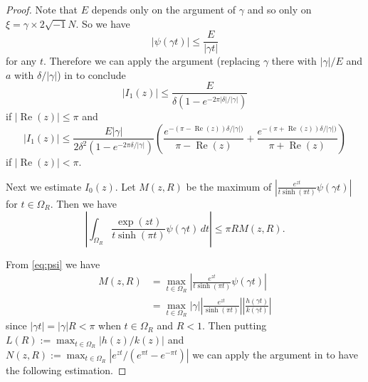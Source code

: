 \documentclass[a4paper]{amsart}
\theoremstyle{plain}
\theoremstyle{definition}
\theoremstyle{remark}
\renewcommand{\Re}{\operatorname{Re}}
\numberwithin{equation}{section}
\begin{document}
\begin{proof}
Note that $E$ depends only on the argument of $\gamma$ and so only on $\xi=\gamma\times 2\sqrt{-1}N$.
So we have
\begin{equation*}
  |\psi(\gamma t)|
  \le
  \frac{E}{|\gamma t|}
\end{equation*}
for any $t$.
Therefore we can apply the argument (replacing $\gamma$ there with $|\gamma|/E$ and $a$ with $\delta/|\gamma|$) in \cite[Page~532]{Andersen/Hansen:JKNOT2006} to conclude
\begin{equation*}
  |I_1(z)|
  \le
  \frac{E}{\delta\left(1-e^{-2\pi|\delta|/|\gamma|}\right)}
\end{equation*}
if $|\Re(z)|\le\pi$ and
\begin{equation*}
  |I_1(z)|
  \le
  \frac{E|\gamma|}
       {2\delta^2\left(1-e^{-2\pi\delta/|\gamma|}\right)}
  \left(
    \frac{e^{-(\pi-\Re(z))\delta/|\gamma|)}}{\pi-\Re(z)}
    +
    \frac{e^{-(\pi+\Re(z))\delta/|\gamma|)}}{\pi+\Re(z)}
  \right)
\end{equation*}
if $|\Re(z)|<\pi$.
\par

Next we estimate $I_0(z)$.
Let $M(z,R)$ be the maximum of $\left|\frac{e^{z t}}{t\sinh(\pi t)}\psi(\gamma t)\right|$ for $t\in\Omega_R$.
Then we have
\begin{equation*}
  \left|
    \int_{\Omega_R}
    \frac{\exp(zt)}{t\sinh(\pi t)}\psi(\gamma t)
    \,dt
  \right|
  \le
  \pi R M(z,R).
\end{equation*}
\par
From \eqref{eq:psi} we have
\begin{equation*}
\begin{split}
  M(z,R)
  &=
  \max_{t\in\Omega_R}
  \left|\frac{e^{z t}}{t\sinh(\pi t)}\psi(\gamma t)\right|
  \\
  &=
  \max_{t\in\Omega_R}
  |\gamma|
  \left|\frac{e^{z t}}{\sinh(\pi t)}\right|
  \left|\frac{h(\gamma t)}{k(\gamma t)}\right|
\end{split}
\end{equation*}
since $|\gamma t|=|\gamma|R<\pi$ when $t\in\Omega_R$ and $R<1$.
Then putting $L(R):=\max_{t\in\Omega_R}|h(z)/k(z)|$ and $N(z,R):=\max_{t\in\Omega_R}\left|e^{zt}/(e^{\pi t}-e^{-\pi t})\right|$ we can apply the argument in \cite[Page~533]{Andersen/Hansen:JKNOT2006} to have the following estimation.

\end{proof}
\end{document}
